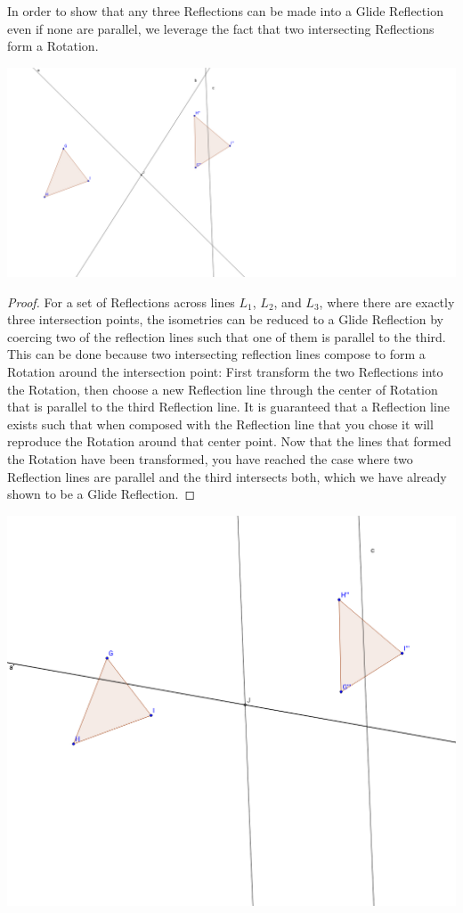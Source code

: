 \documentclass[11pt]{article}
\theoremstyle{definition}
\begin{document}
In order to show that any three Reflections can be made into a Glide
Reflection even if none are parallel, we leverage the fact that two
intersecting Reflections form a Rotation.

\includegraphics[scale=.4]{intersect3}
\begin{proof}
  For a set of Reflections across lines $L_{1}$, $L_{2}$, and $L_{3}$, where
  there are exactly three intersection points, the isometries can be reduced to
  a Glide Reflection by coercing two of the reflection lines such that one of
  them is parallel to the third. This can be done because two intersecting
  reflection lines compose to form a Rotation around the intersection point:
  First transform the two Reflections into the Rotation, then choose a new
  Reflection line through the center of Rotation that is parallel to the third
  Reflection line. It is guaranteed that a Reflection line exists such that
  when composed with the Reflection line that you chose it will reproduce the
  Rotation around that center point. Now that the lines that formed the
  Rotation have been transformed, you have reached the case where two
  Reflection lines are parallel and the third intersects both, which we have
  already shown to be a Glide Reflection.

\end{proof}
\includegraphics[scale=.4]{intersect21}
\end{document}
